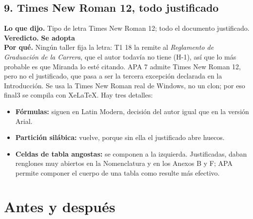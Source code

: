 \documentclass[11pt,a4paper]{article}
\newcommand{\adopta}{\textcolor{adopta}{\textbf{Se adopta}}}
\begin{document}
\subsection*{9. Times New Roman 12, todo justificado}
\textbf{Lo que dijo.} Tipo de letra Times New Roman 12; todo el documento justificado.\\
\textbf{Veredicto.} \adopta{}\\
\textbf{Por qué.} Ningún taller fija la letra: T1 18 la remite al \emph{Reglamento de Graduación de la Carrera}, que el autor todavía no tiene (H-1), así que lo más probable es que Miranda lo esté citando. APA 7 admite Times New Roman 12, pero no el justificado, que pasa a ser la tercera excepción declarada en la Introducción. Se usa la Times New Roman real de Windows, no un clon; por eso final3 se compila con XeLaTeX. Hay tres detalles:
\begin{itemize}
    \item \textbf{Fórmulas:} siguen en Latin Modern, decisión del autor igual que en la versión Arial.
    \item \textbf{Partición silábica:} vuelve, porque sin ella el justificado abre huecos.
    \item \textbf{Celdas de tabla angostas:} se componen a la izquierda. Justificadas, daban renglones muy abiertos en la Nomenclatura y en los Anexos B y F; APA permite componer el cuerpo de una tabla como resulte más efectivo.
\end{itemize}

\section{Antes y después}
\end{document}
